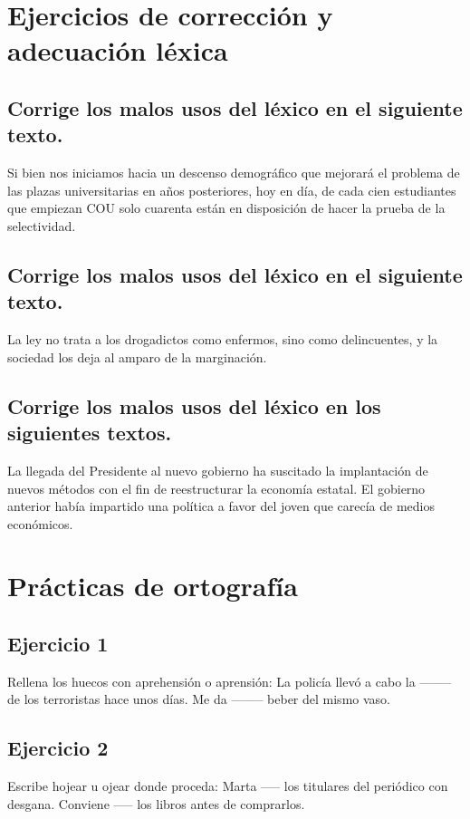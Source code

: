 \documentclass[12pt, a4paper, oneside]{report}
\begin{document}
\chapter*{Ejercicios de corrección y adecuación léxica}
\setcounter{chapter}{2}
\setcounter{section}{0}

\section{Corrige los malos usos
del léxico en el siguiente texto.}
Si bien nos iniciamos hacia un descenso %
demográﬁco que mejorará el problema de
las
plazas
universitarias
en
años
posteriores, hoy en día, de cada cien
estudiantes que empiezan COU solo
cuarenta están en disposición de hacer la
prueba de la selectividad.

\section{Corrige los malos usos
del léxico en el siguiente texto.}
La ley no trata a los drogadictos como
enfermos, sino como delincuentes, y la
sociedad los deja al amparo de la
marginación.

\section{Corrige los malos usos
del léxico en los siguientes textos.}
La llegada del Presidente %
 al nuevo gobierno ha suscitado %
  la implantación de nuevos métodos con el ﬁn de reestructurar
la economía estatal.
El gobierno anterior había impartido una %
política a favor del joven %
que carecía de medios económicos.
\clearpage

\chapter*{Prácticas de ortografía}
\setcounter{chapter}{3}
\setcounter{section}{0}

\section{Ejercicio 1}
Rellena los huecos con
aprehensión o aprensión:
La policía llevó a cabo la --------
de los terroristas hace unos días.
Me da -------- beber del mismo
vaso.

\section{Ejercicio 2}
Escribe hojear u ojear donde
proceda:
Marta ----- los titulares del
periódico con desgana.
Conviene ----- los libros antes de
comprarlos.
\end{document}
